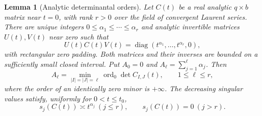 \documentclass[11pt]{amsart}
\newtheorem{lemma}[theorem]{Lemma}
\theoremstyle{definition}\newtheorem{definition}[theorem]{Definition}
\theoremstyle{remark}\newtheorem{remark}[theorem]{Remark}
\begin{document}
\begin{lemma}[Analytic determinantal orders]
\label{lem:v19-analytic-orders}
Let $C(t)$ be a real analytic $q\times b$ matrix near $t=0$, with
rank $r>0$ over the field of convergent Laurent series. There are
unique integers $0\le\alpha_1\le\cdots\le\alpha_r$ and analytic
invertible matrices $U(t),V(t)$ near zero such that
\begin{equation}\label{eq:v19-smith}
 U(t)C(t)V(t)=\operatorname{diag}
           (t^{\alpha_1},\ldots,t^{\alpha_r},0),
\end{equation}
with rectangular zero padding. Both matrices and their inverses are
bounded on a sufficiently small closed interval. Put $A_0=0$ and
$A_\ell=\sum_{j=1}^{\ell}\alpha_j$. Then
\begin{equation}\label{eq:v19-minor-orders}
 A_\ell=\min_{|I|=|J|=\ell}
             \operatorname{ord}_0\det C_{I,J}(t),\qquad 1\le\ell\le r,
\end{equation}
where the order of an identically zero minor is $+\infty$.
The decreasing singular values satisfy, uniformly for $0<t\le t_0$,
\begin{equation}\label{eq:v19-singular-orders}
 s_j(C(t))\asymp t^{\alpha_j}\ (j\le r),\qquad
 s_j(C(t))=0\ (j>r).
\end{equation}
\end{lemma}
\end{document}
